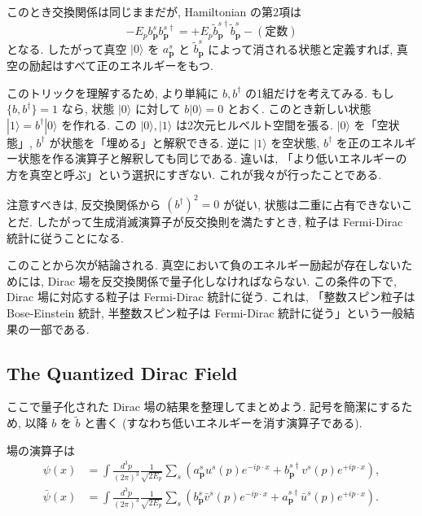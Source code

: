 \documentclass[a4paper,12pt]{article}
\begin{document}
このとき交換関係は同じままだが, Hamiltonian の第2項は
\begin{equation}
- E_p b^s_{\mathbf{p}} b^{s\dagger}_{\mathbf{p}} = + E_p \tilde{b}^{s\dagger}_{\mathbf{p}} \tilde{b}^s_{\mathbf{p}} - (\text{定数})
\end{equation}
となる. したがって真空 $|0\rangle$ を $a^s_{\mathbf{p}}$ と $\tilde{b}^s_{\mathbf{p}}$ によって消される状態と定義すれば, 真空の励起はすべて正のエネルギーをもつ.

このトリックを理解するため, より単純に $b, b^\dagger$ の1組だけを考えてみる.  
もし $\{b, b^\dagger\}=1$ なら, 状態 $|0\rangle$ に対して $b|0\rangle=0$ とおく. このとき新しい状態 $|1\rangle = b^\dagger|0\rangle$ を作れる.  
この $|0\rangle, |1\rangle$ は2次元ヒルベルト空間を張る. $|0\rangle$ を「空状態」, $b^\dagger$ が状態を「埋める」と解釈できる. 逆に $|1\rangle$ を空状態, $b^\dagger$ を正のエネルギー状態を作る演算子と解釈しても同じである.  
違いは, 「より低いエネルギーの方を真空と呼ぶ」という選択にすぎない. これが我々が行ったことである.  

注意すべきは, 反交換関係から $(b^\dagger)^2=0$ が従い, 状態は二重に占有できないことだ. したがって生成消滅演算子が反交換則を満たすとき, 粒子は Fermi-Dirac 統計に従うことになる.  

このことから次が結論される.  
真空において負のエネルギー励起が存在しないためには, Dirac 場を反交換関係で量子化しなければならない. この条件の下で, Dirac 場に対応する粒子は Fermi-Dirac 統計に従う.  
これは, 「整数スピン粒子は Bose-Einstein 統計, 半整数スピン粒子は Fermi-Dirac 統計に従う」という一般結果の一部である.

\subsection*{The Quantized Dirac Field}

ここで量子化された Dirac 場の結果を整理してまとめよう.  
記号を簡潔にするため, 以降 $b$ を $\tilde{b}$ と書く (すなわち低いエネルギーを消す演算子である).  

場の演算子は
\begin{align}
\psi(x) &= \int \frac{d^3p}{(2\pi)^3} \frac{1}{\sqrt{2E_p}} \sum_s 
\left( a^s_{\mathbf{p}} u^s(p)e^{-ip\cdot x} + b^{s\dagger}_{\mathbf{p}} v^s(p)e^{+ip\cdot x} \right),
\tag{3.99} \\
\bar{\psi}(x) &= \int \frac{d^3p}{(2\pi)^3} \frac{1}{\sqrt{2E_p}} \sum_s 
\left( b^s_{\mathbf{p}} \bar{v}^s(p)e^{-ip\cdot x} + a^{s\dagger}_{\mathbf{p}} \bar{u}^s(p)e^{+ip\cdot x} \right).
\tag{3.100}
\end{align}
\end{document}

